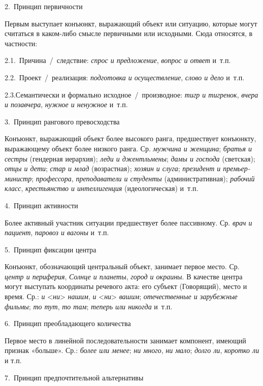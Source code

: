 2.~Принцип первичности

Первым выступает конъюнкт, выражающий объект или ситуацию, которые могут
считаться в каком-либо смысле первичными или исходными. Сюда относятся,
в частности:

2.1.~Причина~/~следствие: \textit{спрос и предложение}, \textit{вопрос и
  ответ} и~т.п.

2.2.~Проект~/~реализация: \textit{подготовка и осуществление}, \textit{слово
  и дело} и~т.п.

2.3.Семантически и формально исходное~/~производное: \textit{тигр и
  тигренок}, \textit{вчера и позавчера}, \textit{нужное и ненужное} и~т.п.

3.~Принцип рангового превосходства

Конъюнкт, выражающий объект более высокого ранга, предшествует
конъюнкту, выражающему объект более низкого ранга. Ср. \textit{мужчина и
  женщина}; \textit{братья и сестры} (гендерная иерархия); \textit{леди и
  джентльмены}; \textit{дамы и господа} (светская); \textit{отцы и дети};
\textit{стар и млад} (возрастная); \textit{хозяин и слуга}; \textit{президент
  и премьер-министр}; \textit{профессора}, \textit{преподаватели и студенты}
(административная); \textit{рабочий класс}, \textit{крестьянство и
  интеллигенция} (идеологическая) и~т.п.

4.~Принцип активности

Более активный участник ситуации предшествует более пассивному. Ср.
\textit{врач и пациент}, \textit{паровоз и вагоны} и~т.п.

5.~Принцип фиксации центра

Конъюнкт, обозначающий центральный объект, занимает первое место. Ср.
\textit{центр и периферия}, \textit{Солнце и планеты}, \textit{город и
  окраины}. В качестве центра могут выступать координаты речевого акта:
его субъект (Говорящий), место и время. Ср.: \textit{и}
\textless{}\textit{ни}\textgreater{} \textit{нашим}, \textit{и}
\textless{}\textit{ни}\textgreater{} \textit{вашим}; \textit{отечественные и
  зарубежные фильмы}; \textit{то тут}, \textit{то там}; \textit{теперь или
  никогда} и~т.п.

6.~Принцип преобладающего количества

Первое место в линейной последовательности занимает компонент, имеющий
признак «больше». Ср.: \textit{более или менее}; \textit{ни много}, \textit{ни
  мало}; \textit{долго ли}, \textit{коротко ли} и т.п.

7.~Принцип предпочтительной альтернативы

